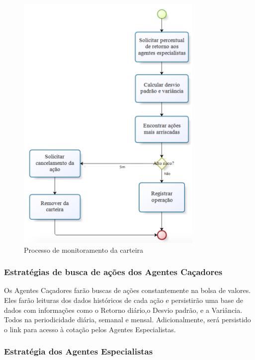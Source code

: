 \begin{figure}[h]
\centering
\label{f15}
\includegraphics[width=0.8\textwidth]{figuras/f15}
\caption{Processo de monitoramento da carteira}
\end{figure}

\subsubsection{Estratégias de busca de ações dos Agentes Caçadores}

Os Agentes Caçadores farão buscas de ações constantemente na bolsa de valores. Eles farão leituras dos dados históricos de cada ação e persistirão uma base de dados com informações como o Retorno diário,o Desvio padrão, e a Variância. Todos na periodicidade diária, semanal e mensal. Adicionalmente, será persistido  o link para acesso à cotação pelos Agentes Especialistas.

\subsubsection{Estratégia dos Agentes Especialistas}

